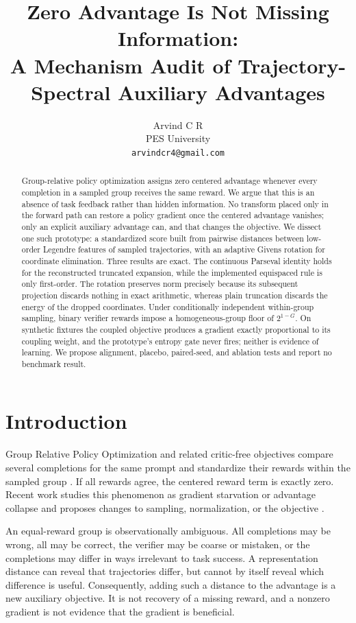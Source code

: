 \documentclass{article}
\title{Zero Advantage Is Not Missing Information:\\
A Mechanism Audit of Trajectory-Spectral Auxiliary Advantages}
\author{%
  Arvind C R \\
  PES University \\
  \texttt{arvindcr4@gmail.com}
}
\begin{document}
\maketitle

\begin{abstract}
Group-relative policy optimization assigns zero centered advantage whenever
every completion in a sampled group receives the same reward.  We argue that
this is an absence of task feedback rather than hidden information.  No
transform placed only in the forward path can restore a policy gradient once
the centered advantage vanishes; only an explicit auxiliary advantage can,
and that changes the objective.  We dissect one such prototype: a standardized
score built from pairwise distances between low-order Legendre features of
sampled trajectories, with an adaptive Givens rotation for coordinate
elimination.  Three results are exact.  The continuous Parseval identity holds
for the reconstructed truncated expansion, while the implemented equispaced
rule is only first-order.  The rotation preserves norm precisely because its
subsequent projection discards nothing in exact arithmetic, whereas plain
truncation discards the energy of the dropped coordinates.  Under
conditionally independent within-group sampling, binary verifier rewards
impose a homogeneous-group floor of $2^{1-G}$.  On synthetic fixtures the
coupled objective produces a gradient exactly proportional to its coupling
weight, and the prototype's entropy gate never fires; neither is evidence of
learning.  We propose alignment, placebo, paired-seed, and ablation tests and
report no benchmark result.
\end{abstract}

\section{Introduction}

Group Relative Policy Optimization and related critic-free objectives compare
several completions for the same prompt and standardize their rewards within
the sampled group \citep{shao2024deepseekmath}.  If all rewards agree, the
centered reward term is exactly zero.  Recent work studies this phenomenon as
gradient starvation or advantage collapse and proposes changes to sampling,
normalization, or the objective \citep{nie2026gradient,he2026advantage}.

An equal-reward group is observationally ambiguous.  All completions may be
wrong, all may be correct, the verifier may be coarse or mistaken, or the
completions may differ in ways irrelevant to task success.  A representation
distance can reveal that trajectories differ, but cannot by itself reveal
which difference is useful.  Consequently, adding such a distance to the
advantage is a new auxiliary objective.  It is not recovery of a missing
reward, and a nonzero gradient is not evidence that the gradient is beneficial.
\end{document}
